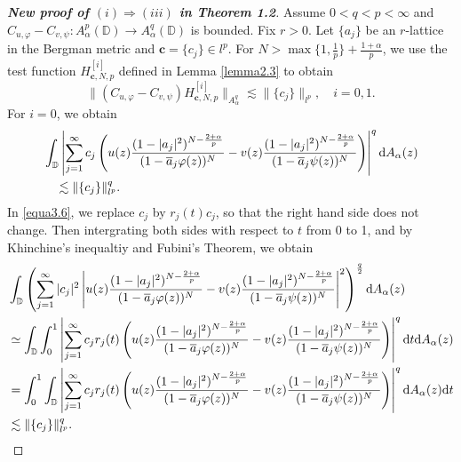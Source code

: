\documentclass[preprint,12pt,times]{elsarticle}
\theoremstyle{definition}
\theoremstyle{remark}
\numberwithin{equation}{section}
\begin{document}
\begin{proof}[{\bf New proof of $(i)\Rightarrow (iii)$ in Theorem 1.2}]
Assume $0<q<p<\infty$ and $C_{u,\varphi}-C_{v,\psi}: A_{\alpha}^p(\mathbb{D})\to A_{\alpha}^q(\mathbb{D})$ is bounded. Fix $r>0$. Let $\{a_j\}$ be an $r$-lattice in the Bergman metric and $\mathbf{c}=\{c_j\}\in l^p$. For $N>\max\{1,\frac{1}{p}\}+\frac{1+\alpha}{p}$, we use the test function $H_{\mathbf{c},N,p}^{[i]}$ defined in Lemma \ref{lemma2.3} to obtain
\begin{equation*}
\|(C_{u,\varphi}-C_{v,\psi})H_{\mathbf{c},N,p}^{[i]}\|_{A_{\alpha}^q}\lesssim \|\{c_j\}\|_{l^p}, \quad i=0,1.
\end{equation*}
For $i=0$, we obtain
\begin{equation}\label{equa3.6}
\begin{split}
&\int_{\mathbb{D}}\left|\sum_{j=1}^{\infty}c_j\left(u(z)\frac{(1-|a_j|^2)^{N-\frac{2+\alpha}{p}}}{(1-\overline{a}_j\varphi(z))^N}-v(z)\frac{(1-|a_j|^2)^{N-\frac{2+\alpha}{p}}}{(1-\overline{a}_j\psi(z))^N}\right)\right|^q{\rm d}A_{\alpha}(z)\\
&\quad \lesssim \|\{c_j\}\|_{l^p}^q.
\end{split}
\end{equation}
In \eqref{equa3.6}, we replace $c_j$ by $r_j(t)c_j$, so that the right hand side does not change. Then intergrating both sides with respect to $t$ from 0 to 1, and by Khinchine's inequaltiy and Fubini's Theorem, we obtain
\begin{equation*}
\begin{split}
&\int_{\mathbb{D}}\left(\sum_{j=1}^{\infty}|c_j|^2\left|u(z)\frac{(1-|a_j|^2)^{N-\frac{2+\alpha}{p}}}{(1-\overline{a}_j\varphi(z))^N}-v(z)\frac{(1-|a_j|^2)^{N-\frac{2+\alpha}{p}}}{(1-\overline{a}_j\psi(z))^N}\right|^2\right)^{\frac{q}{2}}{\rm d}A_{\alpha}(z)\\
&\simeq\int_{\mathbb{D}}\int_0^1\left|\sum_{j=1}^{\infty}c_jr_j(t)\left(u(z)\frac{(1-|a_j|^2)^{N-\frac{2+\alpha}{p}}}{(1-\overline{a}_j\varphi(z))^N}-v(z)\frac{(1-|a_j|^2)^{N-\frac{2+\alpha}{p}}}{(1-\overline{a}_j\psi(z))^N}\right)\right|^q{\rm d}t{\rm d}A_{\alpha}(z)\\
&=\int_{0}^1\int_{\mathbb{D}}\left|\sum_{j=1}^{\infty}c_jr_j(t)\left(u(z)\frac{(1-|a_j|^2)^{N-\frac{2+\alpha}{p}}}{(1-\overline{a}_j\varphi(z))^N}-v(z)\frac{(1-|a_j|^2)^{N-\frac{2+\alpha}{p}}}{(1-\overline{a}_j\psi(z))^N}\right)\right|^q{\rm d}A_{\alpha}(z){\rm d}t\\
&\lesssim \|\{c_j\}\|_{l^p}^q.
\end{split}

\end{equation*}
\end{proof}
\end{document}
